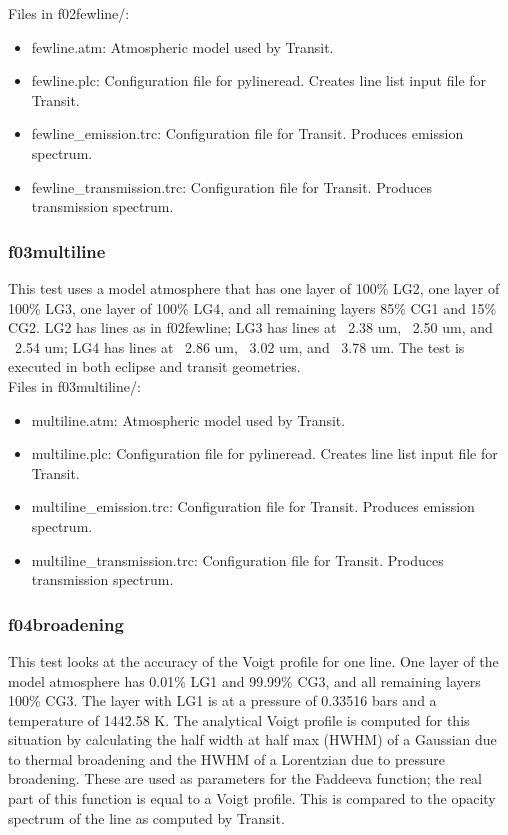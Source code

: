 \documentclass[letterpaper, 12pt]{article}
\begin{document}
Files in f02fewline/:
\begin{itemize} \itemsep0pt
  \item fewline.atm: Atmospheric model used by Transit.
  \item fewline.plc: Configuration file for pylineread. Creates line 
        list input file for Transit.
  \item fewline{\_}emission.trc: Configuration file for Transit. Produces 
        emission spectrum.
  \item fewline{\_}transmission.trc: Configuration file for Transit. Produces 
        transmission spectrum.
\end{itemize}

\subsubsection{f03multiline}
\label{sec:multiline}
This test uses a model atmosphere that has one layer of 100\% LG2, one layer 
of 100\% LG3, one layer of 100\% LG4, and all remaining layers 85\% CG1 and 
15\% CG2. LG2 has lines as in f02fewline; LG3 has lines at ~2.38 um, ~2.50 um, 
and ~2.54 um; LG4 has lines at ~2.86 um, ~3.02 um, and ~3.78 um. The test is 
executed in both eclipse and transit geometries.\\

Files in f03multiline/:
\begin{itemize} \itemsep0pt
  \item multiline.atm: Atmospheric model used by Transit.
  \item multiline.plc: Configuration file for pylineread. Creates line 
        list input file for Transit.
  \item multiline{\_}emission.trc: Configuration file for Transit. Produces 
        emission spectrum.
  \item multiline{\_}transmission.trc: Configuration file for Transit. Produces 
        transmission spectrum.
\end{itemize}

\subsubsection{f04broadening}
\label{sec:broadening}
This test looks at the accuracy of the Voigt profile for one line. 
One layer of the model atmosphere has 0.01\% LG1 and 99.99\% CG3, and 
all remaining layers 100\% CG3. The layer with LG1 is at a pressure of 
0.33516 bars and a temperature of 1442.58 K. The analytical Voigt profile is 
computed for this situation by calculating the half width at half max (HWHM) 
of a Gaussian due to thermal broadening and the HWHM of a Lorentzian due to 
pressure broadening. These are used as parameters for the Faddeeva function; 
the real part of this function is equal to a Voigt profile. This is compared 
to the opacity spectrum of the line as computed by Transit.\\
\end{document}
